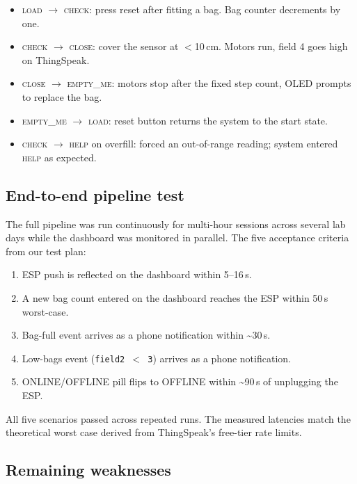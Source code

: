 \documentclass{article}
\begin{document}
\begin{itemize}
    \item \textsc{load} $\to$ \textsc{check}: press reset after fitting a bag. Bag counter decrements by one. \checkmark
    \item \textsc{check} $\to$ \textsc{close}: cover the sensor at $<$10\,cm. Motors run, field 4 goes high on ThingSpeak. \checkmark
    \item \textsc{close} $\to$ \textsc{empty\_me}: motors stop after the fixed step count, OLED prompts to replace the bag. \checkmark
    \item \textsc{empty\_me} $\to$ \textsc{load}: reset button returns the system to the start state. \checkmark
    \item \textsc{check} $\to$ \textsc{help} on overfill: forced an out-of-range reading; system entered \textsc{help} as expected. \checkmark
\end{itemize}

\subsection{End-to-end pipeline test}
\label{sec:test-e2e}

The full pipeline was run continuously for multi-hour sessions across several lab days while the dashboard was monitored in parallel. The five acceptance criteria from our test plan:

\begin{enumerate}
    \item ESP push is reflected on the dashboard within 5--16\,s. \checkmark
    \item A new bag count entered on the dashboard reaches the ESP within 50\,s worst-case. \checkmark
    \item Bag-full event arrives as a phone notification within \textasciitilde 30\,s. \checkmark
    \item Low-bags event (\texttt{field2 $<$ 3}) arrives as a phone notification. \checkmark
    \item ONLINE/OFFLINE pill flips to OFFLINE within \textasciitilde 90\,s of unplugging the ESP. \checkmark
\end{enumerate}

All five scenarios passed across repeated runs. The measured latencies match the theoretical worst case derived from ThingSpeak's free-tier rate limits.

\subsection{Remaining weaknesses}
\label{sec:weaknesses}
\end{document}
